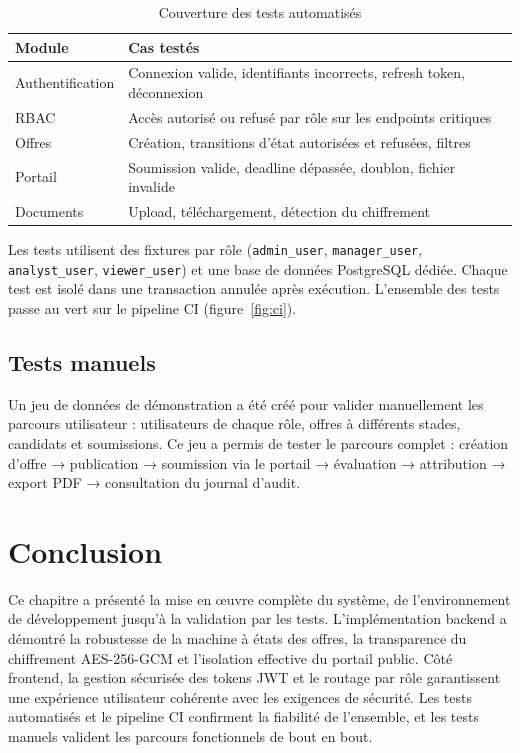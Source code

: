 \begin{table}[ht]
\centering
\caption{Couverture des tests automatisés}
\label{tab:tests}
\begin{tabularx}{\textwidth}{|l|X|}
\hline
\textbf{Module} & \textbf{Cas testés} \\
\hline
Authentification & Connexion valide, identifiants incorrects, refresh token, déconnexion \\
\hline
RBAC & Accès autorisé ou refusé par rôle sur les endpoints critiques \\
\hline
Offres & Création, transitions d'état autorisées et refusées, filtres \\
\hline
Portail & Soumission valide, deadline dépassée, doublon, fichier invalide \\
\hline
Documents & Upload, téléchargement, détection du chiffrement \\
\hline
\end{tabularx}
\end{table}

Les tests utilisent des fixtures par rôle (\texttt{admin\_user}, \texttt{manager\_user}, \texttt{analyst\_user}, \texttt{viewer\_user}) et une base de données PostgreSQL dédiée. Chaque test est isolé dans une transaction annulée après exécution. L'ensemble des tests passe au vert sur le pipeline CI (figure~\ref{fig:ci}).

\subsection{Tests manuels}

Un jeu de données de démonstration a été créé pour valider manuellement les parcours utilisateur : utilisateurs de chaque rôle, offres à différents stades, candidats et soumissions. Ce jeu a permis de tester le parcours complet : création d'offre → publication → soumission via le portail → évaluation → attribution → export PDF → consultation du journal d'audit.

\section{Conclusion}

Ce chapitre a présenté la mise en œuvre complète du système, de l'environnement de développement jusqu'à la validation par les tests. L'implémentation backend a démontré la robustesse de la machine à états des offres, la transparence du chiffrement AES-256-GCM et l'isolation effective du portail public. Côté frontend, la gestion sécurisée des tokens JWT et le routage par rôle garantissent une expérience utilisateur cohérente avec les exigences de sécurité. Les tests automatisés et le pipeline CI confirment la fiabilité de l'ensemble, et les tests manuels valident les parcours fonctionnels de bout en bout.

\newpage
